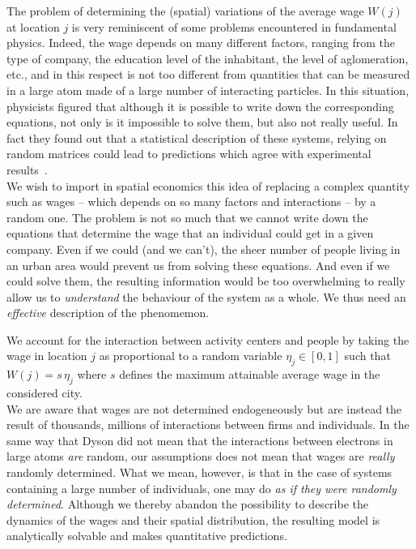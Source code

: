 The problem of determining the (spatial) variations of the average wage $W(j)$
at location $j$ is very reminiscent of some problems encountered in fundamental
physics. Indeed, the wage depends on many different factors, ranging from the
type of company, the education level of the inhabitant, the level of
aglomeration, etc., and in this respect is not too different from quantities
that can be measured in a large atom made of a large number of interacting
particles. In this situation, physicists figured that although it is possible
to write down the corresponding equations, not only is it impossible to solve
them, but also not really useful. In fact they found out that
a statistical description of these systems, relying on random matrices could
lead to predictions which agree with experimental results~\cite{Dyson:1962}.\\

We wish to import in spatial economics this idea of replacing a complex quantity
such as wages -- which depends on so many factors and interactions -- by a random
one. The problem is not so much that we cannot write down the equations that
determine the wage that an individual could get in a given company. Even if we
could (and we can't), the sheer number of people living in an urban area would prevent us
from solving these equations. And even if we could solve them, the resulting
information would be too overwhelming to really allow us to \emph{understand} the
behaviour of the system as a whole. We thus need an \emph{effective}
description of the phenomemon.

We account for the interaction between activity centers and
people by taking the wage in location $j$ as proportional to a random variable
$\eta_j \in \left[ 0,1\right]$ such that $W(j) = s\, \eta_j$ where $s$ defines
the maximum attainable average wage in the considered city.\\

We are aware that wages are not determined endogeneously but are instead the
result of thousands, millions of interactions between firms and individuals. In
the same way that Dyson did not mean that the interactions between electrons in
large atoms \emph{are} random, our assumptions does not mean that wages are
\emph{really} randomly determined. What we mean, however, is that in the case of
systems containing a large number of individuals, one may do \emph{as
if they were randomly determined}. Although we thereby abandon the possibility
to describe the dynamics of the wages and their spatial distribution, the
resulting model is analytically solvable and makes quantitative predictions.

